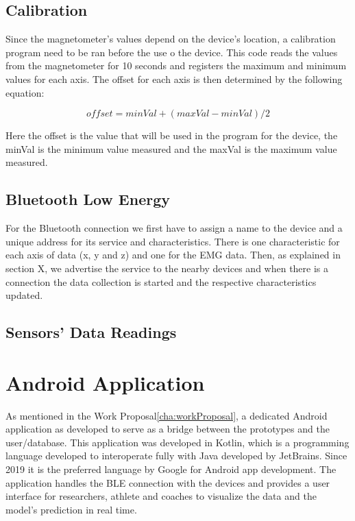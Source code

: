 \subsection{Calibration}
\label{ssec:calibration}

Since the magnetometer's values depend on the device's location, a calibration program need to be ran before the use o the device. This code reads the values from the magnetometer for 10 seconds and registers the maximum and minimum 
values for each axis. 
The offset for each axis is then determined by the following equation:

\[ offset = minVal + (maxVal - minVal) / 2\]

Here the offset is the value that will be used in the program for the device, the minVal is the minimum value measured and the maxVal is the maximum value measured.


\subsection{Bluetooth Low Energy}
\label{ssec:arduino_ble}

For the Bluetooth connection we first have to assign a name to the device and a unique address for its service and characteristics. There is one characteristic for each axis of data (x, y and z) and one for the \gls{EMG} data. 
Then, as explained in section X, we advertise the service to the nearby devices and when there is a connection the data collection is started and the respective characteristics updated.%


\subsection{Sensors' Data Readings}
\label{ssec:arduino_sensors_data_read}




\section{Android Application}
\label{sec:android_app}

As mentioned in the Work Proposal\ref{cha:workProposal}, a dedicated Android application as developed to serve as a bridge between the prototypes and the user/database. This application was developed in Kotlin, which is a programming 
language developed to interoperate fully with Java developed by JetBrains. Since 2019 it is the preferred language by Google for Android app development.
The application handles the \gls{BLE} connection with the devices and provides a user interface for researchers, athlete and coaches to visualize the data and the model's prediction in real time.

